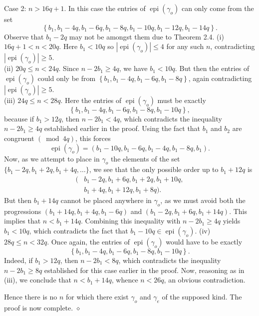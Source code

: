 \documentclass[10pt]{article}
\newcommand{\proofend}{\hfill\(\diamond\)}
\begin{document}
Case 2: $n>16q+1$. In this case the entries of $\operatorname{epi}(\gamma_o)$ can only come from the set
\[
\left\{b_1,b_1-4q,b_1-6q,b_1-8q,b_1-10q,b_1-12q,b_1-14q\right\}.
\]
Observe that $b_1-2q$ may not be amongst them due to Theorem 2.4.
(i) $16 q+1<n<20 q$. Here $b_{1}<10 q$ so $\left|\operatorname{epi}\left(\gamma_{o}\right)\right| \leq 4$ for any such $n$, contradicting $\left|\operatorname{epi}\left(\gamma_{o}\right)\right| \geq 5$.\\
(ii) $20 q \leq n<24 q$. Since $n-2b_{1} \geq 4q$, we have $b_{1}<10q$. But then the entries of $\operatorname{epi}\left(\gamma_{o}\right)$ could only be from $\left\{b_{1}, b_{1}-4 q, b_{1}-6 q, b_{1}-8 q\right\}$, again contradicting $\left|\operatorname{epi}\left(\gamma_{o}\right)\right| \geq 5$.\\
(iii) $24q \leq n<28q$. Here the entries of $\operatorname{epi}(\gamma_o)$ must be exactly
\[
\left\{b_1,b_1-4q,b_1-6q,b_1-8q,b_1-10q\right\},
\]
because if $b_1>12q$, then $n-2b_1<4q$, which contradicts the inequality $n-2b_1 \geq 4q$ established earlier in the proof. Using the fact that $b_1$ and $b_2$ are congruent $(\bmod 4q)$, this forces
\[
\operatorname{epi}(\gamma_o)=\left(b_1-10q,b_1-6q,b_1-4q,b_1-8q,b_1\right).
\]
Now, as we attempt to place in $\gamma_o$ the elements of the set $\{b_1-2q,b_1+2q,b_1+4q,\ldots\}$, we see that the only possible order up to $b_1+12q$ is
\[
\begin{aligned}
(&b_1-2q,b_1+6q,b_1+2q,b_1+10q,\\
 &b_1+4q,b_1+12q,b_1+8q).
\end{aligned}
\]
But then $b_1+14q$ cannot be placed anywhere in $\gamma_o$, as we must avoid both the progressions $\left(b_1+14q,b_1+4q,b_1-6q\right)$ and $\left(b_1-2q,b_1+6q,b_1+14q\right)$. This implies that $n<b_1+14q$. Combining this inequality with $n-2b_1 \geq 4q$ yields $b_1<10q$, which contradicts the fact that $b_1-10q \in \operatorname{epi}(\gamma_o)$.
(iv) $28q \leq n<32q$. Once again, the entries of $\operatorname{epi}(\gamma_o)$ would have to be exactly
\[
\left\{b_1,b_1-4q,b_1-6q,b_1-8q,b_1-10q\right\}.
\]
Indeed, if $b_1>12q$, then $n-2b_1<8q$, which contradicts the inequality $n-2b_1 \geq 8q$ established for this case earlier in the proof. Now, reasoning as in (iii), we conclude that $n<b_1+14q$, whence $n<26q$, an obvious contradiction.

Hence there is no $n$ for which there exist $\gamma_{o}$ and $\gamma_{e}$ of the supposed kind. The proof is now complete. \proofend
\end{document}
